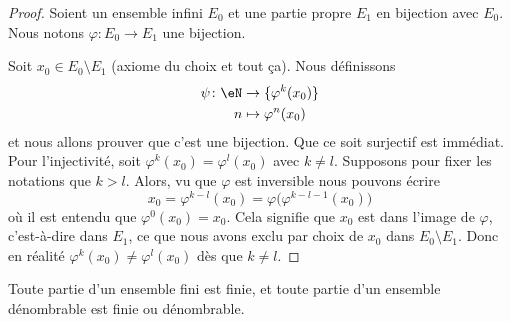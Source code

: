 \begin{proof}
	Soient un ensemble infini \( E_0\) et une partie propre \( E_1\) en bijection avec \( E_0\). Nous notons \( \varphi\colon E_0\to E_1\) une bijection.

	Soit \( x_0\in E_0\setminus E_1\) (axiome du choix et tout ça). Nous définissons
	\begin{equation}
		\begin{aligned}
			\psi\colon \eN & \to \{\varphi^k(x_0)\} \\
			n              & \mapsto \varphi^n(x_0)
		\end{aligned}
	\end{equation}
	et nous allons prouver que c'est une bijection. Que ce soit surjectif est immédiat. Pour l'injectivité, soit \( \varphi^k(x_0)=\varphi^l(x_0)\) avec \( k\neq l\). Supposons pour fixer les notations que \( k>l\). Alors, vu que \( \varphi\) est inversible nous pouvons écrire
	\begin{equation}
		x_0=\varphi^{k-l}(x_0)=\varphi\big( \varphi^{k-l-1}(x_0) \big)
	\end{equation}
	où il est entendu que \( \varphi^0(x_0)=x_0\). Cela signifie que \( x_0\) est dans l'image de \( \varphi\), c'est-à-dire dans \( E_1\), ce que nous avons exclu par choix de \( x_0\) dans \( E_0\setminus E_1\). Donc en réalité \( \varphi^k(x_0)\neq \varphi^l(x_0)\) dès que \( k\neq l\).
\end{proof}

\begin{proposition} \label{PropQEPoozLqOQ}
	Toute partie d'un ensemble fini est finie, et toute partie d'un ensemble dénombrable est finie ou dénombrable.
\end{proposition}

